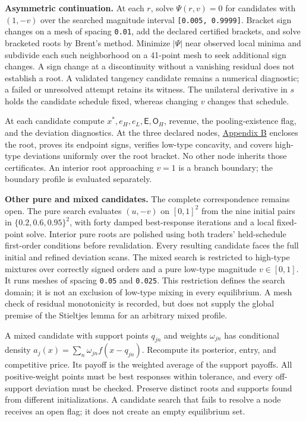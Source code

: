 \documentclass[
  11pt,
]{article}
\begin{document}
\textbf{Asymmetric continuation.} At each \(r\), solve \(\Psi(r,v)=0\)
for candidates with \((1,-v)\) over the searched magnitude interval
\texttt{{[}0.005,\ 0.9999{]}}. Bracket sign changes on a mesh of spacing
\texttt{0.01}, add the declared certified brackets, and solve bracketed
roots by Brent's method. Minimize \(|\Psi|\) near observed local minima
and subdivide each such neighborhood on a 41-point mesh to seek
additional sign changes. A sign change at a discontinuity without a
vanishing residual does not establish a root. A validated tangency
candidate remains a numerical diagnostic; a failed or unresolved attempt
retains its witness. The unilateral derivative in \(s\) holds the
candidate schedule fixed, whereas changing \(v\) changes that schedule.

At each candidate compute \(x^*,e_H,e_L,\mathsf E,\mathsf O_H\),
revenue, the pooling-existence flag, and the deviation diagnostics. At
the three declared nodes, \hyperref[oa-b]{Appendix B} encloses the root,
proves its endpoint signs, verifies low-type concavity, and covers
high-type deviations uniformly over the root bracket. No other node
inherits those certificates. An interior root approaching \(v=1\) is a
branch boundary; the boundary profile is evaluated separately.

\textbf{Other pure and mixed candidates.} The complete correspondence
remains open. The pure search evaluates \((u,-v)\) on \([0,1]^2\) from
the nine initial pairs in \(\{0.2,0.6,0.95\}^2\), with forty damped
best-response iterations and a local fixed-point solve. Interior pure
roots are polished using both traders' held-schedule first-order
conditions before revalidation. Every resulting candidate faces the full
initial and refined deviation scans. The mixed search is restricted to
high-type mixtures over correctly signed orders and a pure low-type
magnitude \(v\in[0,1]\). It runs meshes of spacing \texttt{0.05} and
\texttt{0.025}. This restriction defines the search domain; it is not an
exclusion of low-type mixing in every equilibrium. A mesh check of
residual monotonicity is recorded, but does not supply the global
premise of the Stieltjes lemma for an arbitrary mixed profile.

A mixed candidate with support points \(q_{jn}\) and weights
\(\omega_{jn}\) has conditional density
\(a_j(x)=\sum_n\omega_{jn}f(x-q_{jn})\). Recompute its
posterior, entry, and competitive price. Its payoff is the weighted
average of the support payoffs. All positive-weight points must be best
responses within tolerance, and every off-support deviation must be
checked. Preserve distinct roots and supports found from different
initializations. A candidate search that fails to resolve a node
receives an open flag; it does not create an empty equilibrium set.
\end{document}
